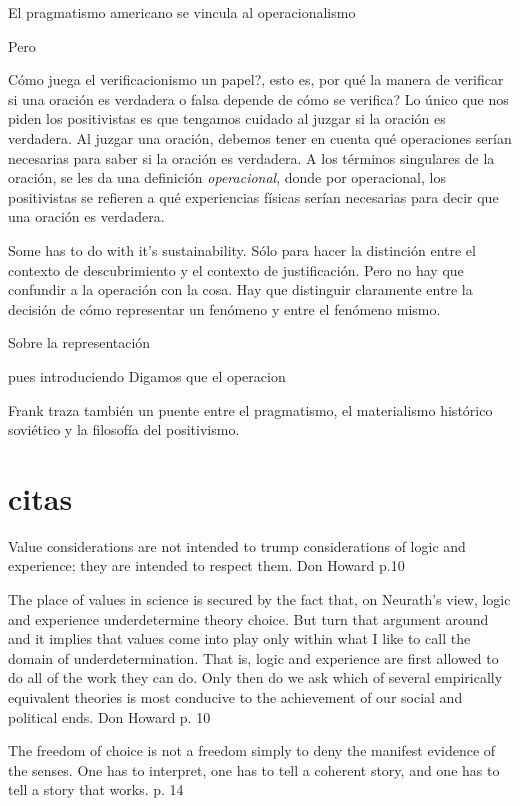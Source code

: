 El pragmatismo americano se vincula al operacionalismo

Pero

Cómo juega el verificacionismo un papel?, esto es, por qué la manera de verificar si una oración es verdadera o falsa depende de cómo se verifica?
Lo único que nos piden los positivistas es que tengamos cuidado al juzgar si la oración es verdadera.
Al juzgar una oración, debemos tener en cuenta qué operaciones serían necesarias para saber si la oración es verdadera.
A los términos singulares de la oración, se les da una definición \emph{operacional}, donde por operacional, los positivistas se refieren a qué experiencias físicas serían necesarias para decir que una oración es verdadera.

Some has to do with it's sustainability.
Sólo para hacer la distinción entre el contexto de descubrimiento y el contexto de justificación.
Pero no hay que confundir a la operación con la cosa.
Hay que distinguir claramente entre la decisión de cómo representar un fenómeno y entre el fenómeno mismo.

Sobre la representación

pues introduciendo
Digamos que el operacion

Frank traza también un puente entre el pragmatismo, el materialismo histórico soviético y la filosofía del positivismo.


\section{citas}



Value considerations are not intended to trump considerations of logic and experience; they are intended to respect them. Don Howard p.10

The place of values in science is secured by the fact that, on Neurath’s view, logic and experience underdetermine theory choice. But turn that argument around and it implies that values come into play only within what I like to call the domain of underdetermination. That is, logic and experience are first allowed to do all of the work they can do. Only then do we ask which of several empirically equivalent theories is most conducive to the achievement of our social and political ends. Don Howard p. 10

The freedom of choice is not a freedom simply to deny the manifest evidence of the senses. One has to interpret, one has to tell a coherent story, and one has to tell a story that works. p. 14


